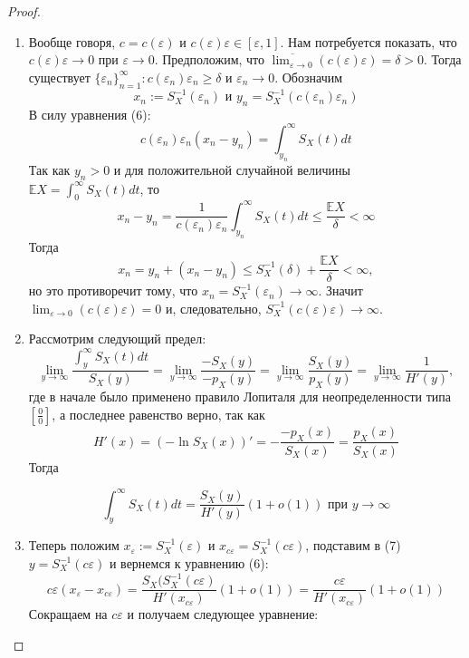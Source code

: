 \documentclass[12pt]{article}
\theoremstyle{plain}
\theoremstyle{definition}
\theoremstyle{remark}
\begin{document}
\begin{proof}
\begin{enumerate}
    \begin{equation}
        c\varepsilon(S_X^{-1}(\varepsilon) - S_X^{-1}(c\varepsilon)) = \int^{+\infty}_{S_X^{-1}(c\varepsilon)}S_X(t)dt
    \end{equation}
    \item
    Вообще говоря, $c = c(\varepsilon)$ и $c(\varepsilon) \varepsilon \in [\varepsilon, 1]$. Нам потребуется показать, что $c(\varepsilon)\varepsilon \to 0$ при $\varepsilon \to 0$. Предположим, что $\overline{\lim_{\varepsilon \to 0}} (c(\varepsilon)\varepsilon) = \delta > 0$. Тогда существует $\{\varepsilon_n\}_{n=1}^{\infty} : c(\varepsilon_n)\varepsilon_n \geq \delta$ и $\varepsilon_n \to 0$.  
    Обозначим 
    \[
        x_n := S_X^{-1}(\varepsilon_n) \text{ и } y_n = S_X^{-1}(c(\varepsilon_n)\varepsilon_n)
    \]
    В силу уравнения (6):
    \[
        c(\varepsilon_n)\varepsilon_n(x_n - y_n) = \int_{y_n}^{\infty}S_X(t)dt
    \]
    Так как $y_n > 0$ и для положительной случайной величины $\mathbb{E}X = \int_0^{\infty}S_X(t)dt$, то
    \[
        x_n - y_n = \frac{1}{c(\varepsilon_n)\varepsilon_n} \int_{y_n}^{\infty}S_X(t)dt \leq \frac{\mathbb{E}X}{\delta} < \infty
    \]
    Тогда 
    \[
        x_n = y_n + (x_n - y_n) \leq S_X^{-1}(\delta) + \frac{\mathbb{E}X}{\delta} < \infty,
    \]
    но это противоречит тому, что $x_n = S_X^{-1}(\varepsilon_n) \to \infty$. Значит $\lim_{\varepsilon \to 0}(c(\varepsilon)\varepsilon) = 0$ и, следовательно, $S_X^{-1}(c(\varepsilon)\varepsilon) \to \infty$. 

    \item 
    Рассмотрим следующий предел:
    \[
        \lim_{y \to \infty}\frac{\int_y^{\infty}S_X(t)dt}{S_X(y)} = \lim_{y \to \infty}\frac{-S_X(y)}{-p_X(y)} = \lim_{y \to \infty}\frac{S_X(y)}{p_X(y)} =\lim_{y \to \infty}\frac{1}{H'(y)},
    \]
    где в начале было применено правило Лопиталя для неопределенности типа $[\frac{0}{0}]$, а последнее равенство верно, так как
    \[
        H'(x)=(-\ln S_X(x))' = -\frac{-p_X(x)}{S_X(x)} = \frac{p_X(x)}{S_X(x)}
    \]
    Тогда 
    
    \begin{equation}
        \int_y^{\infty}S_X(t)dt = \frac{S_X(y)}{H'(y)}(1+o(1)) \text{ при } y\to \infty
    \end{equation}
    
    \item
    Теперь положим $x_\varepsilon := S_X^{-1}(\varepsilon)$ и $x_{c\varepsilon} = S_X^{-1}(c\varepsilon)$, подставим в (7) $y = S_X^{-1}(c\varepsilon)$ и вернемся к уравнению (6):
    \[
        c\varepsilon(x_{\varepsilon} - x_{c\varepsilon}) = \frac{S_X(S_X^{-1}(c\varepsilon)}{H'(x_{c\varepsilon})}(1+o(1)) = \frac{c\varepsilon}{H'(x_{c\varepsilon})}(1+o(1))
    \]
    Сокращаем на $c\varepsilon$ и получаем следующее уравнение:


\end{enumerate}
\end{proof}
\end{document}
